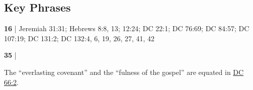 \subsection{Key Phrases} %
	\label{COVENANT-PHRASES}

	\begin{compactdesc}
		\item[new covenant] \textbf{16} | Jeremiah 31:31; Hebrews 8:8, 13; 12:24; DC 22:1; DC 76:69; DC 84:57; DC 107:19; DC 131:2; DC 132:4, 6, 19, 26, 27, 41, 42
		\item[everlasting covenant] \textbf{35} | 
			\begin{compactdesc}
				\item[Commentary] The ``everlasting covenant'' and the ``fulness of the gospel'' are equated in \hyperref[DC66-2]{DC 66:2}.
			\end{compactdesc}
	\end{compactdesc}
	


	
